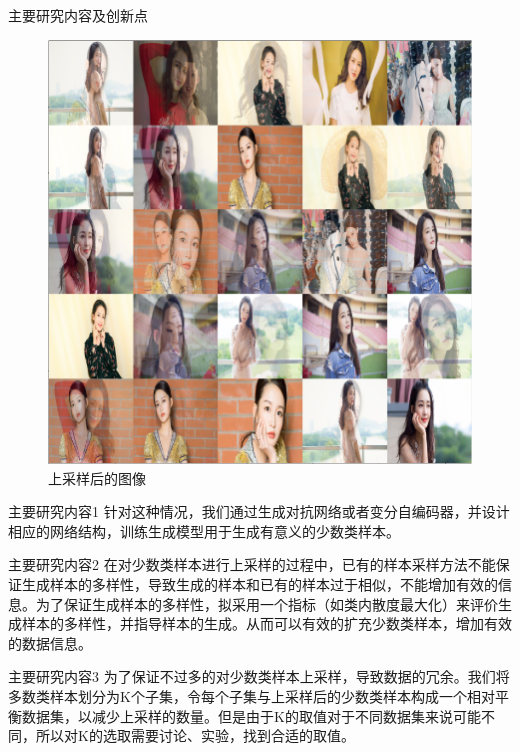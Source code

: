 \documentclass{beamer}
\begin{document}
\begin{frame}{主要研究内容及创新点}\pause
    \begin{figure}[t]
        \includegraphics[scale=0.25]{liSMOTE2.png}
        \caption{上采样后的图像}
    \end{figure}
\end{frame}

\begin{frame}{主要研究内容1}\pause
    针对这种情况，我们通过生成对抗网络或者变分自编码器，并设计相应的网络结构，训练生成模型用于生成有意义的少数类样本。
\end{frame}

\begin{frame}{主要研究内容2}\pause
    在对少数类样本进行上采样的过程中，已有的样本采样方法不能保证生成样本的多样性，导致生成的样本和已有的样本过于相似，不能增加有效的信息。为了保证生成样本的多样性，拟采用一个指标（如类内散度最大化）来评价生成样本的多样性，并指导样本的生成。从而可以有效的扩充少数类样本，增加有效的数据信息。
\end{frame}

\begin{frame}{主要研究内容3}\pause
    为了保证不过多的对少数类样本上采样，导致数据的冗余。我们将多数类样本划分为K个子集，令每个子集与上采样后的少数类样本构成一个相对平衡数据集，以减少上采样的数量。但是由于K的取值对于不同数据集来说可能不同，所以对K的选取需要讨论、实验，找到合适的取值。
\end{frame}
\end{document}

